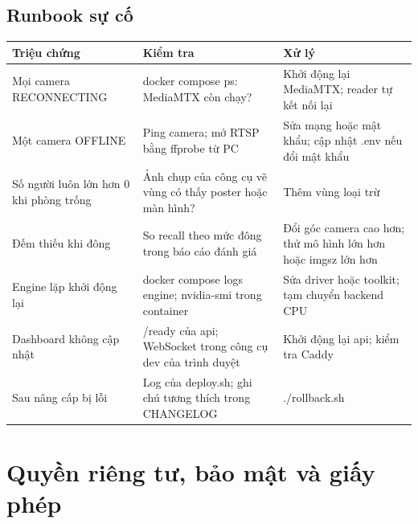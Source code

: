 \documentclass[10pt,a4paper,oneside,openany]{report}
\newcommand{\breakus}{\textunderscore\allowbreak}
\newcommand{\file}[1]{{\ttfamily\let\_\breakus #1}}
\newcommand{\code}[1]{{\ttfamily\let\_\breakus #1}}
\newcommand{\tabhead}[1]{\textsf{\bfseries\color{ink}#1}}
\newenvironment{bang}{\par\small\rowcolors{2}{rowgray}{white}}{\par\vspace{0.3em}}
\begin{document}
\section{Runbook sự cố}
\begin{bang}
\begin{xltabular}{\linewidth}{L{38mm}L{52mm}Y}
\toprule
\tabhead{Triệu chứng} & \tabhead{Kiểm tra} & \tabhead{Xử lý} \\
\midrule
\endhead
Mọi camera \code{RECONNECTING} & \code{docker compose ps}: MediaMTX còn chạy? & Khởi động lại MediaMTX; reader tự kết nối lại \\
Một camera \code{OFFLINE} & Ping camera; mở RTSP bằng \code{ffprobe} từ PC & Sửa mạng hoặc mật khẩu; cập nhật \file{.env} nếu đổi mật khẩu \\
Số người luôn lớn hơn 0 khi phòng trống & Ảnh chụp của công cụ vẽ vùng có thấy poster hoặc màn hình? & Thêm vùng loại trừ \\
Đếm thiếu khi đông & So recall theo mức đông trong báo cáo đánh giá & Đổi góc camera cao hơn; thử mô hình lớn hơn hoặc \code{imgsz} lớn hơn \\
Engine lặp khởi động lại & \code{docker compose logs engine}; \code{nvidia-smi} trong container & Sửa driver hoặc toolkit; tạm chuyển backend CPU \\
Dashboard không cập nhật & \code{/ready} của api; WebSocket trong công cụ dev của trình duyệt & Khởi động lại api; kiểm tra Caddy \\
Sau nâng cấp bị lỗi & Log của \code{deploy.sh}; ghi chú tương thích trong CHANGELOG & \code{./rollback.sh} \\
\bottomrule
\end{xltabular}
\end{bang}
\chapter{Quyền riêng tư, bảo mật và giấy phép}\label{ch:riengtu}
\end{document}
